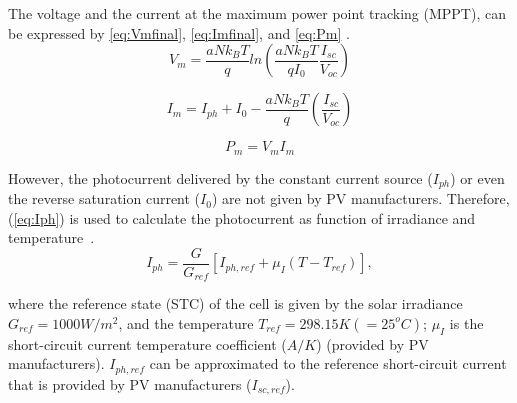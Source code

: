 \documentclass[journal]{IEEEtran}
\begin{document}
%
%

The voltage and the current at the maximum power point tracking (MPPT), can be expressed by \eqref{eq:Vmfinal}, \eqref{eq:Imfinal}, and \eqref{eq:Pm} \cite{Saloux}. %
\begin{equation}
\label{eq:Vmfinal}
V_{m}=\dfrac{aNk_{B}T}{q} ln \left( \dfrac{aNk_{B}T}{qI_{0}} \dfrac{I_{sc}}{V_{oc}}  \right) 
\end{equation}

\begin{equation}
\label{eq:Imfinal}
I_{m} = I_{ph} + I_{0} - \dfrac{aNk_{B}T}{q} \left( \dfrac{I_{sc}}{V_{oc}} \right)  
\end{equation}

\begin{equation}
\label{eq:Pm}
P_{m} = V_{m} I_{m}
\end{equation}

%
However, the photocurrent delivered by the constant current source ($I_{ph}$) or even the reverse saturation current ($ I_{0} $) are not given by PV manufacturers. Therefore, (\ref{eq:Iph}) is used to calculate the photocurrent as function of irradiance and temperature~\cite{Villalva}.
\begin{equation}
\label{eq:Iph}
I_{ph}=\dfrac{G}{G_{ref}} \left[ I_{ph,ref} + \mu_{I} \left( T-T_{ref} \right)    \right], 
\end{equation}

\noindent where the reference state (STC) of the cell is given by the solar irradiance $ G_{ref}=1000 W/m^{2} $, and the temperature $ T_{ref}=298.15 K (=25^{o}C) $; $ \mu_{I} $ is the short-circuit current temperature coefficient ($A/K$) %
(provided by PV manufacturers). $ I_{ph,ref} $ can be approximated to the reference short-circuit current \cite{Jakhrani} that is provided by PV manufacturers ($ I_{sc,ref} $).
\end{document}
